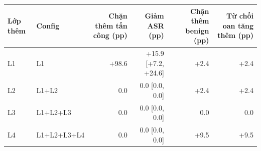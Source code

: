 \begin{tabular}{llrrrr}
\toprule
Lớp thêm & Config & Chặn thêm tấn công (pp) & Giảm ASR (pp) & Chặn thêm benign (pp) & Từ chối oan tăng thêm (pp) \\
\midrule
L1 & L1 & +98.6 & +15.9 [+7.2, +24.6] & +2.4 & +2.4 \\
L2 & L1+L2 & 0.0 & 0.0 [0.0, 0.0] & +2.4 & +2.4 \\
L3 & L1+L2+L3 & 0.0 & 0.0 [0.0, 0.0] & 0.0 & 0.0 \\
L4 & L1+L2+L3+L4 & 0.0 & 0.0 [0.0, 0.0] & +9.5 & +9.5 \\
\bottomrule
\end{tabular}
